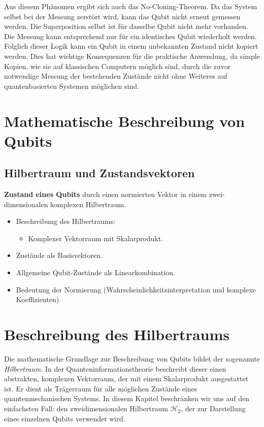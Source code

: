 Aus diesem Phänomen ergibt sich auch das No-Cloning-Theorem. Da das System selbst bei der Messung zerstört wird, kann das Qubit nicht erneut gemessen werden. Die Superposition selbst ist für dasselbe Qubit nicht mehr vorhanden. Die Messung kann entsprechend nur für ein identisches Qubit wiederholt werden.
Folglich dieser Logik kann ein Qubit in einem unbekannten Zustand nicht kopiert werden. Dies hat wichtige Konsequenzen für die praktische Anwendung, da simple Kopien, wie sie auf klassischen Computern möglich sind, durch die zuvor notwendige Messung der bestehenden Zustände nicht ohne Weiteres auf quantenbasierten Systemen möglichen sind.
\cite{hughes_quantum_2021}

\section{Mathematische Beschreibung von Qubits}

\subsection{Hilbertraum und Zustandsvektoren}
\textbf{Zustand eines Qubits} durch einen normierten Vektor in einem zwei-dimensionalen komplexen Hilbertraum.
\begin{itemize}
    \item Beschreibung des Hilbertraums:
    \begin{itemize}
        \item Komplexer Vektorraum mit Skalarprodukt.
    \end{itemize}
    \item Zustände als Basisvektoren.
    \item Allgemeine Qubit-Zustände als Linearkombination.
    \item Bedeutung der Normierung (Wahrscheinlichkeitsinterpretation und komplexe Koeffizienten).
\end{itemize}

\section*{Beschreibung des Hilbertraums}

Die mathematische Grundlage zur Beschreibung von Qubits bildet der sogenannte \textit{Hilbertraum}. In der Quanteninformationstheorie beschreibt dieser einen abstrakten, komplexen Vektorraum, der mit einem Skalarprodukt ausgestattet ist. Er dient als Trägerraum für alle möglichen Zustände eines quantenmechanischen Systems. In diesem Kapitel beschränken wir uns auf den einfachsten Fall: den zweidimensionalen Hilbertraum $\mathcal{H}_2$, der zur Darstellung eines einzelnen Qubits verwendet wird.

